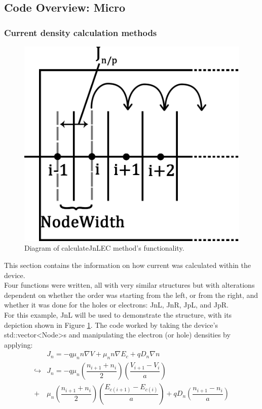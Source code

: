 \documentclass[titlepage]{article}
\begin{document}
\subsection{Code Overview: Micro}
\subsubsection{Current density calculation methods}
\begin{figure}
	\centering
	\includegraphics[scale=0.2]{Figures/JnL}
	\caption{\label{fig:Mic:JnL} Diagram of calculateJnLEC method's functionality.}
\end{figure}
This section contains the information on how current was calculated within the device.\\ Four functions were written, all with very similar structures but with alterations dependent on whether the order was starting from the left, or from the right, and whether it was done for the holes or electrons: JnL, JnR, JpL, and JpR. \\
For this example, JnL will be used to demonstrate the structure, with its depiction shown in Figure \ref{fig:Mic:JnL}.
The code worked by taking the device's std::vector<Node>s and manipulating the electron (or hole) densities by applying:
\begin{eqnarray}
	&J_n = -q\mu_n n\nabla V + \mu_n n \nabla E_c + q D_n \nabla n\\
		\hookrightarrow &J_n = -q\mu_n(\dfrac{n_{i+1}+n_{i}}{2})(\dfrac{V_{i+1}-V_{i}}{a})\\
	+& \mu_n (\dfrac{n_{i+1}+n_{i}}{2})(\dfrac{E_{c(i+1)}-E_{c(i)}}{a}) + qD_n(\dfrac{n_{i+1}-n_{i}}{a}) \\
\end{eqnarray}
\end{document}
